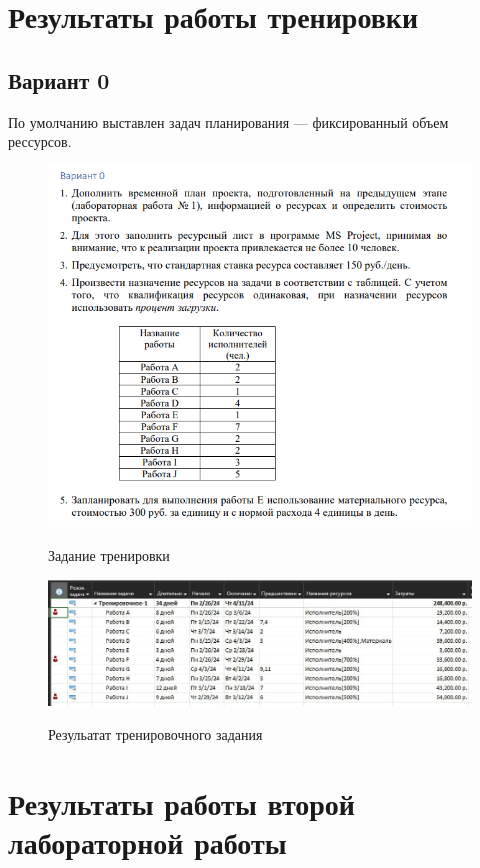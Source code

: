 \section{Результаты работы тренировки}

\subsection{Вариант 0}

По умолчанию выставлен задач планирования --- фиксированный объем рессурсов.

\begin{figure}[ht!]
	\includegraphics[width=0.75\linewidth]{assets/images/image_2024-02-27_09-41-29.png}
	\label{fig:r2}
	\caption{Задание тренировки}
\end{figure}
\FloatBarrier

\begin{figure}[ht!]
	\includegraphics[width=\linewidth]{assets/images/task2.jpg}
	\label{fig:r2}
	\caption{Резульатат тренировочного задания}
\end{figure}
\FloatBarrier

\section{Результаты работы второй лабораторной работы}

